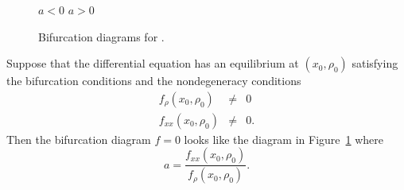 \documentclass{ximera}
\begin{document}
\begin{figure}[htb]
           \centerline{%
	    \qquad \qquad
	   }
	 \hspace{1.0in} $a<0$ \hspace{2.8in}  $a>0$  
           \caption{Bifurcation diagrams for \protect{}.}
           \label{F:1dsaddle}
\end{figure}

\begin{theorem}  \label{T:saddlenode} 
Suppose that the differential equation  has an equilibrium
at $(x_0,\rho_0)$ satisfying the bifurcation conditions 
and the nondegeneracy conditions
\begin{equation}  \label{e:nondegen1}
\begin{array}{rcl} 
f_\rho(x_0,\rho_0) & \neq & 0 \\
f_{xx}(x_0,\rho_0) & \neq & 0. 
\end{array}
\end{equation}
Then the bifurcation diagram $f=0$ looks like the diagram in 
Figure~\ref{F:1dsaddle} where 
\[
a = \frac{f_{xx}(x_0,\rho_0)}{f_\rho(x_0,\rho_0)}.
\]
\end{theorem}
\end{document}
